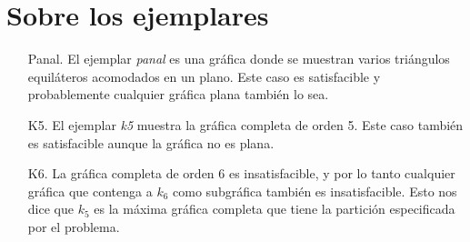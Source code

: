 \documentclass{article}
\begin{document}
\section*{Sobre los ejemplares}

\begin{itemize}
\item[Panal.] El ejemplar \textit{panal} es una gráfica donde se muestran varios triángulos equiláteros acomodados en un plano. Este caso es satisfacible y probablemente cualquier gráfica plana también lo sea.
\item[K5.] El ejemplar \textit{k5} muestra la gráfica completa de orden 5. Este caso también es satisfacible aunque la gráfica no es plana.
\item[K6.] La gráfica completa de orden 6 es insatisfacible, y por lo tanto cualquier gráfica que contenga a $k_6$ como subgráfica también es insatisfacible. Esto nos dice que $k_5$ es la máxima gráfica completa que tiene la partición especificada por el problema.
\end{itemize}
\end{document}
